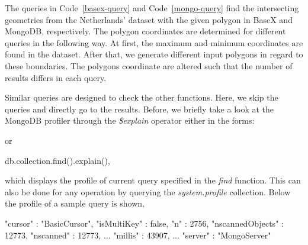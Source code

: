 \documentclass[a4paper,12pt]{article}
\begin{document}
The queries in Code~\ref{basex-query} and Code~\ref{mongo-query} find the intersecting geometries from the Netherlands' dataset with the given polygon in BaseX and MongoDB, respectively. The polygon coordinates are determined for different queries in the following way. At first, the maximum and minimum coordinates are found in the dataset. After that, we generate different input polygons in regard to these boundaries. The polygons coordinate are altered such that the number of results differs in each query.
\vspace{10px}
\vspace{10px}
\vspace{10px}

Similar queries are designed to check the other functions. Here, we skip the queries and directly go to the results. Before, we briefly take a look at the MongoDB profiler through the \textit{\$explain} operator either in the forms:
\vspace{10px}
 or 
 \begin{fakeJSON}
db.collection.find().explain(),
 \end{fakeJSON}
\vspace{10px}
which displays the profile of current query specified in the \textit{find} function.
This can also be done for any operation by querying the \textit{system.profile} collection.
Below the profile of a sample query is shown,
\vspace{10px}
\begin{fakeJSON}
"cursor" : "BasicCursor",
"isMultiKey" : false,
"n" : 2756,
"nscannedObjects" : 12773,
"nscanned" : 12773,
...
"millis" : 43907,
...
"server" : "MongoServer"
\end{fakeJSON}
\vspace{10px}
\end{document}
